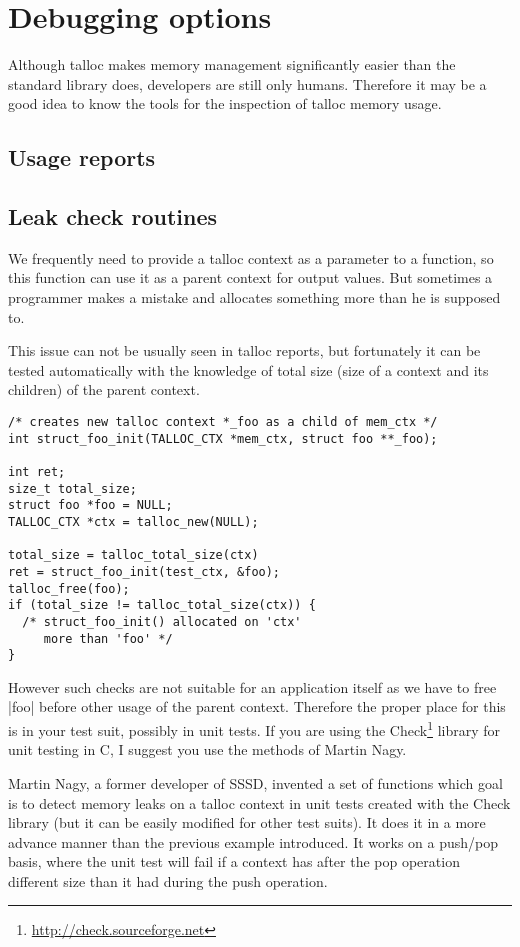 \section{Debugging options}

Although talloc makes memory management significantly easier than the standard
library does, developers are still only humans. Therefore it may be a good idea
to know the tools for the inspection of talloc memory usage.

\subsection{Usage reports}

\subsection{Leak check routines}

We frequently need to provide a talloc context as a parameter to a function, so
this function can use it as a parent context for output values. But sometimes a
programmer makes a mistake and allocates something more than he is supposed to.

This issue can not be usually seen in talloc reports, but fortunately it can be
tested automatically with the knowledge of total size (size of a context and
its children) of the parent context.

\begin{lstlisting}[caption={Leak check example}]
/* creates new talloc context *_foo as a child of mem_ctx */
int struct_foo_init(TALLOC_CTX *mem_ctx, struct foo **_foo);

int ret;
size_t total_size;
struct foo *foo = NULL;
TALLOC_CTX *ctx = talloc_new(NULL);

total_size = talloc_total_size(ctx)
ret = struct_foo_init(test_ctx, &foo);
talloc_free(foo);
if (total_size != talloc_total_size(ctx)) {
  /* struct_foo_init() allocated on 'ctx'
     more than 'foo' */
}
\end{lstlisting}

However such checks are not suitable for an application itself as we have to
free |foo| before other usage of the parent context. Therefore the proper place
for this is in your test suit, possibly in unit tests. If you are using the
Check\footnote{\url{http://check.sourceforge.net}} library for unit testing in
C, I suggest you use the methods of Martin Nagy.

Martin Nagy, a former developer of SSSD, invented a set of functions which goal
is to detect memory leaks on a talloc context in unit tests created with the
Check library (but it can be easily modified for other test suits). It does it
in a more advance manner than the previous example introduced. It works on a
push/pop basis, where the unit test will fail if a context has after the pop
operation different size than it had during the push operation.



